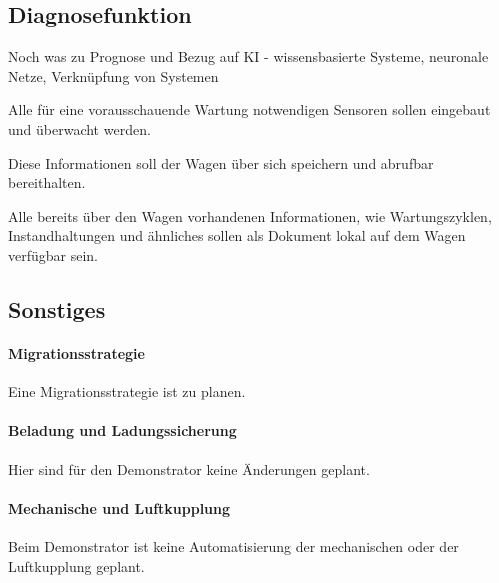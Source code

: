 \subsection{Diagnosefunktion}
Noch was zu Prognose und Bezug auf KI - wissensbasierte Systeme, neuronale Netze, Verknüpfung von Systemen
\begin{feat}
Alle für eine vorausschauende Wartung notwendigen Sensoren sollen eingebaut und überwacht werden.
\end{feat}
\begin{comment}
\begin{rem} [zu Anf. 56]
Beispiele dafür sind:
\begin{itemize}
    \item Lagertemperaturüberwachung
    \item Stoßüberwachung
    \item Laufleistung
    \item Drehkugelpfanne am Drehgestell
    \item Bremsbelagüberwachung
    \item Lagerzustände
    \item Flachstellen
    \item Entgleisungssicherheit aufgrund von Beladung
\end{itemize}
\end{rem}
\end{comment}
\begin{feat}
Diese Informationen soll der Wagen über sich speichern und abrufbar bereithalten.
\end{feat}
\begin{feat}
Alle bereits über den Wagen vorhandenen Informationen, wie Wartungszyklen, Instandhaltungen und ähnliches sollen als Dokument lokal auf dem Wagen  verfügbar sein.
\end{feat}

\subsection{Sonstiges}
\paragraph{Migrationsstrategie}
\begin{feat}
Eine Migrationsstrategie ist zu planen.
\end{feat}
\paragraph{Beladung und Ladungssicherung}
Hier sind für den Demonstrator keine Änderungen geplant.
\paragraph{Mechanische und Luftkupplung}
Beim Demonstrator ist keine Automatisierung der mechanischen oder der Luftkupplung geplant.
